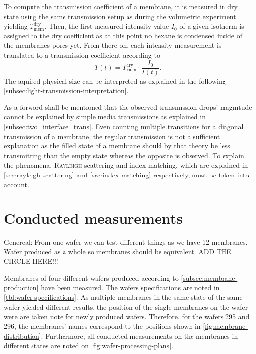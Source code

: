 \documentclass[../thesis.tex]{subfiles}
\begin{document}
          To compute the transmission coefficient of a membrane, it is measured in dry state using the same transmission setup as during the volumetric experiment yielding $T_\mathrm{mem}^\mathrm{dry}$. Then, the first measured intensity value $I_0$ of a given isotherm is assigned to the dry coefficient as at this point no hexane is condensed inside of the membranes pores yet. From there on, each intensity measurement is translated to a transmission coefficient according to
          \begin{equation}
              T(t) = T_\mathrm{mem}^\mathrm{dry} \cdot \frac{I_0}{I(t)}.
          \end{equation}
          The aquired physical size can be interpreted as explained in the following  \cref{subsec:light-transmission-interpretation}.

          As a forword shall be mentioned that the observed transmission drops' magnitude cannot be explained by simple media transmissions as explained in \cref{subsec:two_interface_trans}. Even counting multiple transitions for a diagonal transmission of a membrane, the regular transmission is not a sufficient explanation as the filled state of a membrane should by that theory be less transmitting than the empty state whereas the opposite is observed. To explain the phenomena, \textsc{Rayleigh} scattering and index matching, which are explained in \cref{sec:rayleigh-scattering} and \cref{sec:index-matching} respectively, must be taken into account.


      \section{Conducted measurements}
      \label{sec:conducted-measurements}

        Genereal: From one wafer we can test different things as we have 12 membranes. Wafer produced as a whole so membranes should be equivalent. ADD THE CIRCLE HERE!!!
        \medskip

        Membranes of four different wafers produced according to \cref{subsec:membrane-production} have been measured. The wafers specifications are noted in \cref{tbl:wafer-specifications}. As multiple membranes in the same state of the same wafer yielded different results, the position of the single membranes on the wafer were are taken note for newly produced wafers. Therefore, for the wafers 295 and 296, the membranes' names correspond to the positions shown in \cref{fig:membrane-distribution}. Furthermore, all conducted measurements on the membranes in different states are noted on \cref{fig:wafer-processing-plans}.
\end{document}
